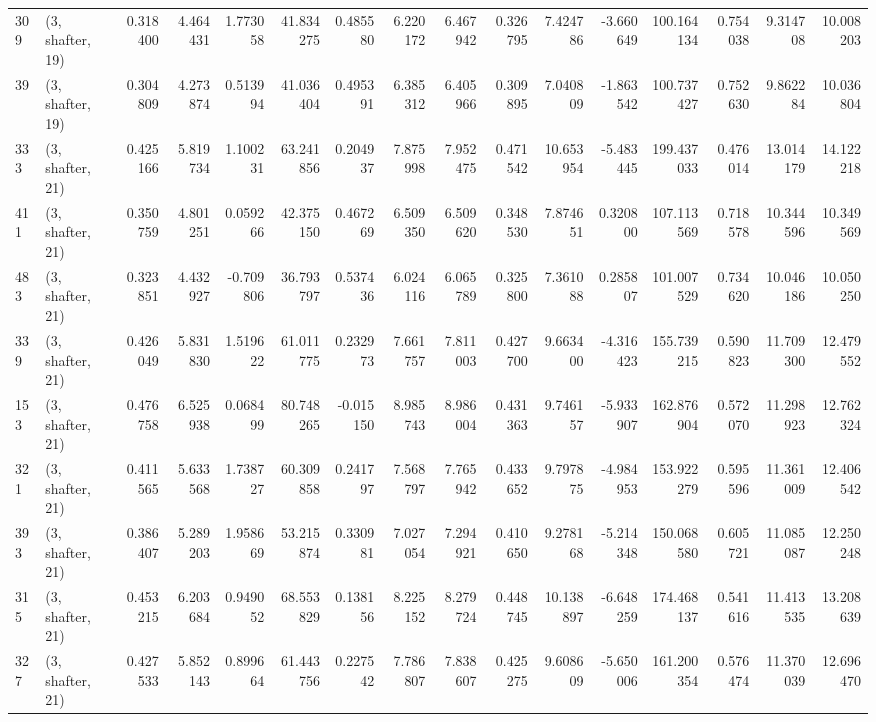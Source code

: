 \begin{tabular}{llrrrrrrrrrrrrrr}
309 &  (3, shafter, 19) &   0.318400 &   4.464431 &   1.773058 &    41.834275 &   0.485580 &   6.220172 &   6.467942 &  0.326795 &   7.424786 &  -3.660649 &   100.164134 &  0.754038 &   9.314708 &  10.008203 \\
39  &  (3, shafter, 19) &   0.304809 &   4.273874 &   0.513994 &    41.036404 &   0.495391 &   6.385312 &   6.405966 &  0.309895 &   7.040809 &  -1.863542 &   100.737427 &  0.752630 &   9.862284 &  10.036804 \\
333 &  (3, shafter, 21) &   0.425166 &   5.819734 &   1.100231 &    63.241856 &   0.204937 &   7.875998 &   7.952475 &  0.471542 &  10.653954 &  -5.483445 &   199.437033 &  0.476014 &  13.014179 &  14.122218 \\
411 &  (3, shafter, 21) &   0.350759 &   4.801251 &   0.059266 &    42.375150 &   0.467269 &   6.509350 &   6.509620 &  0.348530 &   7.874651 &   0.320800 &   107.113569 &  0.718578 &  10.344596 &  10.349569 \\
483 &  (3, shafter, 21) &   0.323851 &   4.432927 &  -0.709806 &    36.793797 &   0.537436 &   6.024116 &   6.065789 &  0.325800 &   7.361088 &   0.285807 &   101.007529 &  0.734620 &  10.046186 &  10.050250 \\
339 &  (3, shafter, 21) &   0.426049 &   5.831830 &   1.519622 &    61.011775 &   0.232973 &   7.661757 &   7.811003 &  0.427700 &   9.663400 &  -4.316423 &   155.739215 &  0.590823 &  11.709300 &  12.479552 \\
153 &  (3, shafter, 21) &   0.476758 &   6.525938 &   0.068499 &    80.748265 &  -0.015150 &   8.985743 &   8.986004 &  0.431363 &   9.746157 &  -5.933907 &   162.876904 &  0.572070 &  11.298923 &  12.762324 \\
321 &  (3, shafter, 21) &   0.411565 &   5.633568 &   1.738727 &    60.309858 &   0.241797 &   7.568797 &   7.765942 &  0.433652 &   9.797875 &  -4.984953 &   153.922279 &  0.595596 &  11.361009 &  12.406542 \\
393 &  (3, shafter, 21) &   0.386407 &   5.289203 &   1.958669 &    53.215874 &   0.330981 &   7.027054 &   7.294921 &  0.410650 &   9.278168 &  -5.214348 &   150.068580 &  0.605721 &  11.085087 &  12.250248 \\
315 &  (3, shafter, 21) &   0.453215 &   6.203684 &   0.949052 &    68.553829 &   0.138156 &   8.225152 &   8.279724 &  0.448745 &  10.138897 &  -6.648259 &   174.468137 &  0.541616 &  11.413535 &  13.208639 \\
327 &  (3, shafter, 21) &   0.427533 &   5.852143 &   0.899664 &    61.443756 &   0.227542 &   7.786807 &   7.838607 &  0.425275 &   9.608609 &  -5.650006 &   161.200354 &  0.576474 &  11.370039 &  12.696470 \\

\end{tabular}
